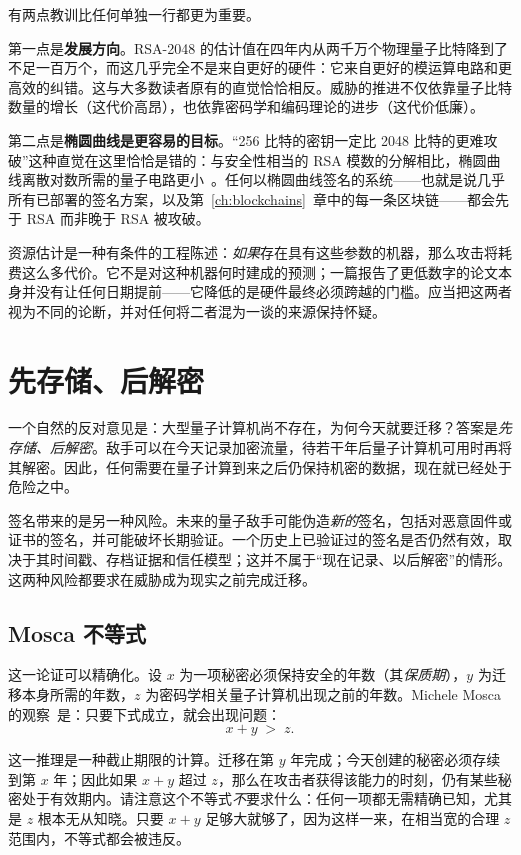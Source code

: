 有两点教训比任何单独一行都更为重要。

第一点是\textbf{发展方向}。RSA-2048 的估计值在四年内从两千万个物理量子比特降到了不足一百万个，而这几乎完全不是来自更好的硬件：它来自更好的模运算电路和更高效的纠错。这与大多数读者原有的直觉恰恰相反。威胁的推进不仅依靠量子比特数量的增长（这代价高昂），也依靠密码学和编码理论的进步（这代价低廉）。

第二点是\textbf{椭圆曲线是更容易的目标}。“256 比特的密钥一定比 2048 比特的更难攻破”这种直觉在这里恰恰是错的：与安全性相当的 RSA 模数的分解相比，椭圆曲线离散对数所需的量子电路更小~\cite{litinski2023}。任何以椭圆曲线签名的系统——也就是说几乎所有已部署的签名方案，以及第~\ref{ch:blockchains}~章中的每一条区块链——都会先于 RSA 而非晚于 RSA 被攻破。

\begin{remark}
资源估计是一种有条件的工程陈述：\emph{如果}存在具有这些参数的机器，那么攻击将耗费这么多代价。它不是对这种机器何时建成的预测；一篇报告了更低数字的论文本身并没有让任何日期提前——它降低的是硬件最终必须跨越的门槛。应当把这两者视为不同的论断，并对任何将二者混为一谈的来源保持怀疑。
\end{remark}

\section{先存储、后解密}

一个自然的反对意见是：大型量子计算机尚不存在，为何今天就要迁移？答案是\emph{先存储、后解密}。敌手可以在今天记录加密流量，待若干年后量子计算机可用时再将其解密。因此，任何需要在量子计算到来之后仍保持机密的数据，现在就已经处于危险之中。

签名带来的是另一种风险。未来的量子敌手可能伪造\emph{新的}签名，包括对恶意固件或证书的签名，并可能破坏长期验证。一个历史上已验证过的签名是否仍然有效，取决于其时间戳、存档证据和信任模型；这并不属于“现在记录、以后解密”的情形。这两种风险都要求在威胁成为现实之前完成迁移。

\subsection*{Mosca 不等式}

这一论证可以精确化。设 $x$ 为一项秘密必须保持安全的年数（其\emph{保质期}），$y$ 为迁移本身所需的年数，$z$ 为密码学相关量子计算机出现之前的年数。Michele Mosca 的观察~\cite{mosca2025}是：只要下式成立，就会出现问题：
\[
  x + y \;>\; z .
\]

这一推理是一种截止期限的计算。迁移在第 $y$ 年完成；今天创建的秘密必须存续到第 $x$ 年；因此如果 $x + y$ 超过 $z$，那么在攻击者获得该能力的时刻，仍有某些秘密处于有效期内。请注意这个不等式\emph{不}要求什么：任何一项都无需精确已知，尤其是 $z$ 根本无从知晓。只要 $x + y$ 足够大就够了，因为这样一来，在相当宽的合理 $z$ 范围内，不等式都会被违反。

